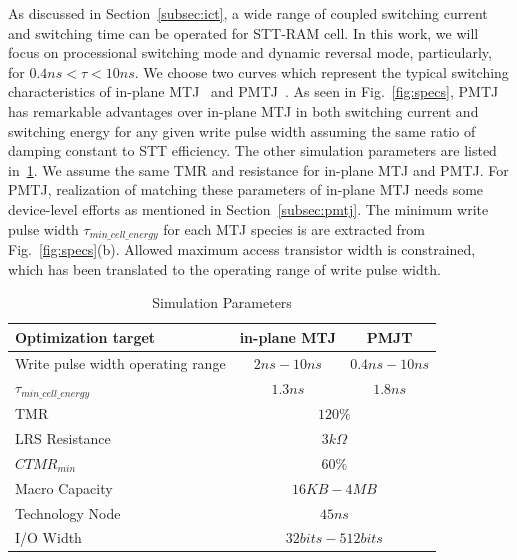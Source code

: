 As discussed in Section~\ref{subsec:ict}, a wide range of coupled switching current and switching time can be operated for STT-RAM cell. In this work, we will focus on processional switching mode and dynamic reversal mode, particularly, for $0.4ns < \tau < 10ns$. We choose two curves which represent the typical switching characteristics of in-plane MTJ~\cite{STTRAM:Qualcomm09} and PMTJ~\cite{PMTJ:Toshiba08}. As seen in Fig.~\ref{fig:specs}, PMTJ has remarkable advantages over in-plane MTJ in both switching current and switching energy for any given write pulse width assuming the same ratio of damping constant to STT efficiency. The other simulation parameters are listed in~\ref{tb:parameters}. We assume the same TMR and resistance for in-plane MTJ and PMTJ. For PMTJ, realization of matching these parameters of in-plane MTJ needs some device-level efforts as mentioned in Section~\ref{subsec:pmtj}. The minimum write pulse width $\tau_{min\_cell\_energy}$ for each MTJ species is are extracted from Fig.~\ref{fig:specs}(b). Allowed maximum access transistor width is constrained, which has been translated to the operating range of write pulse width.

\begin{table}[t]
\centering
\caption{Simulation Parameters}
\label{tb:parameters}
\vspace{-5pt}
\begin{tabular}{ l | c | c }
\hline \hline
Optimization target & in-plane MTJ & PMJT\\
\hline
Write pulse width operating range & $2ns-10ns$ & $0.4ns-10ns$\\
\hline
$\tau_{min\_cell\_energy}$ & $1.3ns$ & $1.8ns$\\
\hline
TMR & \multicolumn{2}{c}{$120\%$}\\
\hline
LRS Resistance & \multicolumn{2}{c}{$3k\Omega$}\\
\hline
$CTMR_{min}$ & \multicolumn{2}{c}{$60\%$} \\
\hline
Macro Capacity & \multicolumn{2}{c}{$16KB - 4MB$}\\
\hline
Technology Node & \multicolumn{2}{c}{$45ns$}\\
\hline
I/O Width & \multicolumn{2}{c}{$32bits-512bits$}\\
\hline\hline
\end{tabular}
\vspace{-10pt}
\end{table}

